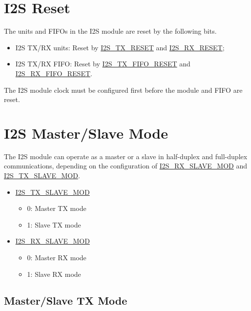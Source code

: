 \documentclass[main\_\_EN.tex]{subfiles}
\begin{document}
\section{I2S Reset}\label{sec:i2s-reset}

The units and FIFOs in the I2S module are reset by the following bits.

\begin{itemize}
\item I2S TX/RX units: Reset by \hyperref[fielddesc:I2STXRESET]{I2S\_TX\_RESET} and  \hyperref[fielddesc:I2SRXRESET]{I2S\_RX\_RESET};
\item I2S TX/RX FIFO: Reset by \hyperref[fielddesc:I2STXFIFORESET]{I2S\_TX\_FIFO\_RESET} and \hyperref[fielddesc:I2SRXFIFORESET]{I2S\_RX\_FIFO\_RESET}.
\end{itemize}

\begin{tiplisting}
The I2S module clock must be configured first before the module and FIFO are reset.
\end{tiplisting} 

\section{I2S Master/Slave Mode}

The \chipname{} I2S module can operate as a master or a slave in half-duplex and full-duplex communications, depending on the configuration of  \hyperref[fielddesc:I2SRXSLAVEMOD]{I2S\_RX\_SLAVE\_MOD} and  \hyperref[fielddesc:I2STXSLAVEMOD]{I2S\_TX\_SLAVE\_MOD}.

\begin{itemize}
    \item \hyperref[fielddesc:I2STXSLAVEMOD]{I2S\_TX\_SLAVE\_MOD} 
    \begin{itemize}
        \item 0: Master TX mode
        \item 1: Slave TX mode
    \end{itemize}
    \item \hyperref[fielddesc:I2SRXSLAVEMOD]{I2S\_RX\_SLAVE\_MOD}
    \begin{itemize}
        \item 0: Master RX mode
        \item 1: Slave RX mode
    \end{itemize}
\end{itemize}

\subsection{Master/Slave TX Mode} \label{sec:i2s-master-slave-tx-mode}
\end{document}
